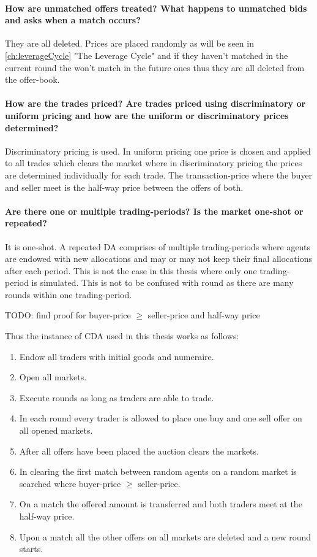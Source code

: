 \documentclass[../Bachelorarbeit.tex]{subfiles}
\begin{document}
\paragraph{How are unmatched offers treated? What happens to unmatched bids and asks when a match occurs?} They are all deleted. Prices are placed randomly as will be seen in \ref{ch:leverageCycle} "The Leverage Cycle" and if they haven't matched in the current round the won't match in the future ones thus they are all deleted from the offer-book.

\paragraph{How are the trades priced? Are trades priced using discriminatory or uniform pricing and how are the uniform or discriminatory prices determined?} Discriminatory pricing is used. In uniform pricing one price is chosen and applied to all trades which clears the market where in discriminatory pricing the prices are determined individually for each trade. The \gls{transaction-price} where the buyer and seller meet is the half-way price between the offers of both.

\paragraph{Are there one or multiple trading-periods? Is the market one-shot or repeated?} It is one-shot. A repeated DA comprises of multiple trading-periods where agents are endowed with new allocations and may or may not keep their final allocations after each period. This is not the case in this thesis where only one trading-period is simulated. This is not to be confused with \Gls{round} as there are many rounds within one trading-period.

\medskip

TODO: find proof for buyer-price $\geq$ seller-price and half-way price

\medskip

Thus the instance of CDA used in this thesis works as follows:

\begin{enumerate}
\item Endow all traders with initial goods and numeraire.
\item Open all markets.
\item Execute rounds as long as traders are able to trade.
\item In each round every trader is allowed to place one buy and one sell offer on all opened markets.
\item After all offers have been placed the auction clears the markets.
\item In clearing the first match between random agents on a random market is searched where buyer-price $\geq$ seller-price.
\item On a match the offered amount is transferred and both traders meet at the half-way price.
\item Upon a match all the other offers on all markets are deleted and a new round starts.
\end{enumerate}
\end{document}
